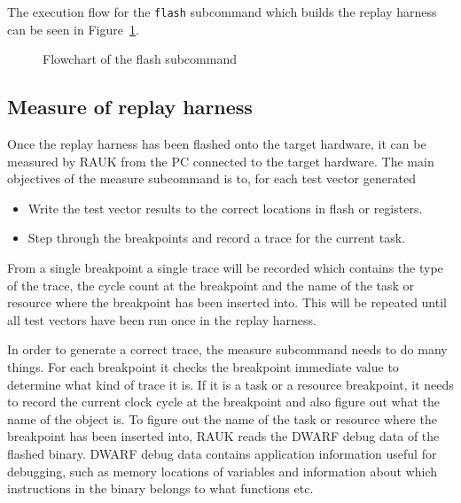 The execution flow for the \texttt{flash} subcommand which builds the replay
harness can be seen in Figure~\ref{fig:flashcmd}.
\begin{figure}[H]\label{fig:flashcmd}
    \centering
    \caption{Flowchart of the flash subcommand}
\end{figure}

\subsection{Measure of replay harness}
Once the replay harness has been flashed onto the target hardware, it can
be measured by RAUK from the PC connected to the target hardware. The main
objectives of the measure subcommand is to, for each test vector generated
\begin{itemize}
   \item Write the test vector results to the correct locations in flash or registers.
   \item Step through the breakpoints and record a trace for the current task.
\end{itemize}
From a single breakpoint a single trace will be recorded which contains the
type of the trace, the cycle count at the breakpoint and the name of the task
or resource where the breakpoint has been inserted into. This will be repeated
until all test vectors have been run once in the replay harness.

In order to generate a correct trace, the measure subcommand needs to do many
things. For each breakpoint it checks the breakpoint immediate value to
determine what kind of trace it is. If it is a task or a resource breakpoint, it
needs to record the current clock cycle at the breakpoint and also figure out
what the name of the object is. To figure out the name of the task or resource
where the breakpoint has been inserted into, RAUK reads the
DWARF\cite{dwarfspec} debug data of the flashed binary. DWARF debug data
contains application information useful for debugging, such as memory
locations of variables and information about which instructions in the binary
belongs to what functions etc.

